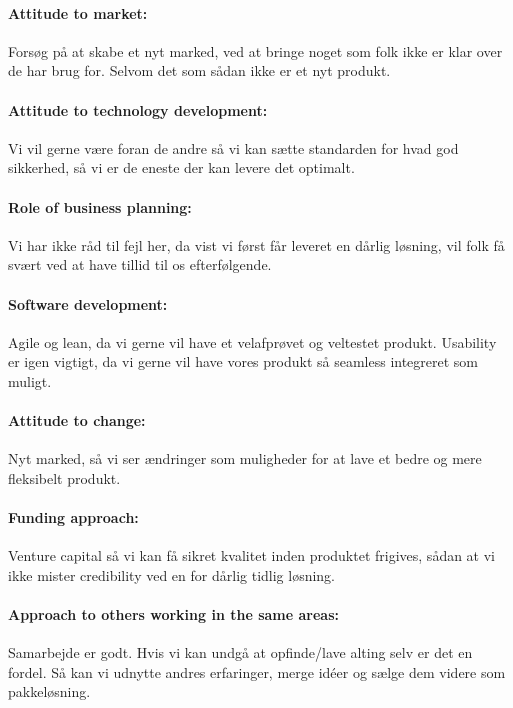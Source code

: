 \paragraph{Attitude to market:} Forsøg på at skabe et nyt marked, ved at bringe noget som folk ikke er klar over de har brug for.
Selvom det som sådan ikke er et nyt produkt.

\paragraph{Attitude to technology development:} Vi vil gerne være foran de andre så vi kan sætte standarden for hvad god sikkerhed, så vi er de eneste der kan levere det optimalt.

\paragraph{Role of business planning:} Vi har ikke råd til fejl her, da vist vi først får leveret en dårlig løsning, vil folk få svært ved at have tillid til os efterfølgende.

\paragraph{Software development:} Agile og lean, da vi gerne vil have et velafprøvet og veltestet produkt.
Usability er igen vigtigt, da vi gerne vil have vores produkt så seamless integreret som muligt.

\paragraph{Attitude to change:} Nyt marked, så vi ser ændringer som muligheder for at lave et bedre og mere fleksibelt produkt.

\paragraph{Funding approach:} Venture capital så vi kan få sikret kvalitet inden produktet frigives, sådan at vi ikke mister credibility ved en for dårlig tidlig løsning.

\paragraph{Approach to others working in the same areas:} Samarbejde er godt.
Hvis vi kan undgå at opfinde/lave alting selv er det en fordel.
Så kan vi udnytte andres erfaringer, merge idéer og sælge dem videre som pakkeløsning.

